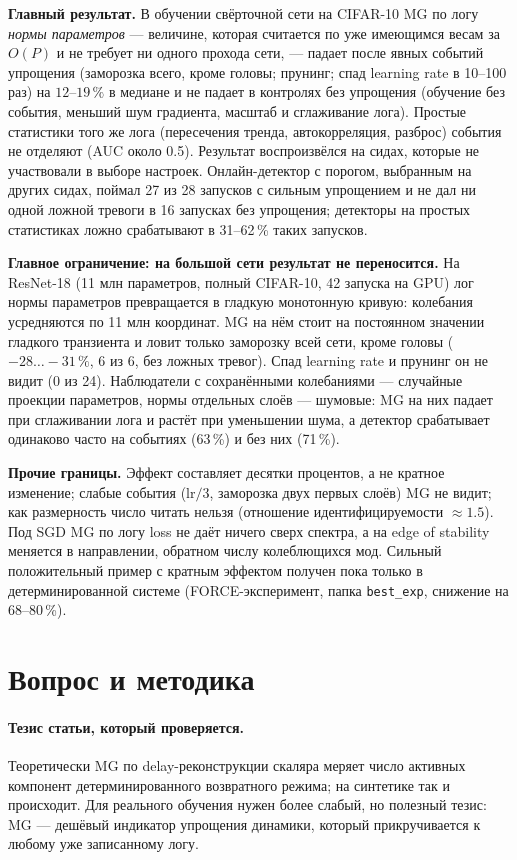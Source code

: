 \documentclass[10pt,a4paper]{article}
\begin{document}
\textbf{Главный результат.} В обучении свёрточной сети на CIFAR-10 MG по логу
\emph{нормы параметров} --- величине, которая считается по уже имеющимся весам за
$O(P)$ и не требует ни одного прохода сети, --- падает после явных событий упрощения
(заморозка всего, кроме головы; прунинг; спад learning rate в 10--100 раз) на
$12$--$19\,\%$ в медиане и не падает в контролях без упрощения (обучение без события,
меньший шум градиента, масштаб и сглаживание лога). Простые статистики того же лога
(пересечения тренда, автокорреляция, разброс) события не отделяют (AUC около 0.5).
Результат воспроизвёлся на сидах, которые не участвовали в выборе настроек. Онлайн-детектор с порогом, выбранным на других сидах, поймал 27 из 28 запусков с сильным упрощением и не дал ни одной ложной тревоги в 16 запусках без упрощения; детекторы на простых статистиках ложно срабатывают в 31--62\,\% таких запусков.

\textbf{Главное ограничение: на большой сети результат не переносится.} На ResNet-18
(11 млн параметров, полный CIFAR-10, 42 запуска на GPU) лог нормы параметров
превращается в гладкую монотонную кривую: колебания усредняются по 11 млн
координат. MG на нём стоит на постоянном значении гладкого транзиента и ловит только
заморозку всей сети, кроме головы ($-28\ldots-31\,\%$, 6 из 6, без ложных тревог).
Спад learning rate и прунинг он не видит (0 из 24). Наблюдатели с сохранёнными
колебаниями --- случайные проекции параметров, нормы отдельных слоёв --- шумовые:
MG на них падает при сглаживании лога и растёт при уменьшении шума, а детектор
срабатывает одинаково часто на событиях (63\,\%) и без них (71\,\%).

\textbf{Прочие границы.} Эффект составляет десятки процентов, а не кратное изменение; слабые
события (lr$/3$, заморозка двух первых слоёв) MG не видит; как размерность число
читать нельзя (отношение идентифицируемости $\approx 1.5$). Под SGD MG по логу loss
не даёт ничего сверх спектра, а на edge of stability меняется в направлении,
обратном числу колеблющихся мод. Сильный положительный пример с кратным эффектом
получен пока только в детерминированной системе (FORCE-эксперимент, папка
\texttt{best\_exp}, снижение на 68--80\,\%).

\section{Вопрос и методика}

\paragraph{Тезис статьи, который проверяется.} Теоретически MG по
delay-реконструкции скаляра меряет число активных компонент детерминированного
возвратного режима; на синтетике так и происходит. Для реального обучения нужен
более слабый, но полезный тезис: MG --- дешёвый индикатор упрощения динамики,
который прикручивается к любому уже записанному логу.
\end{document}
